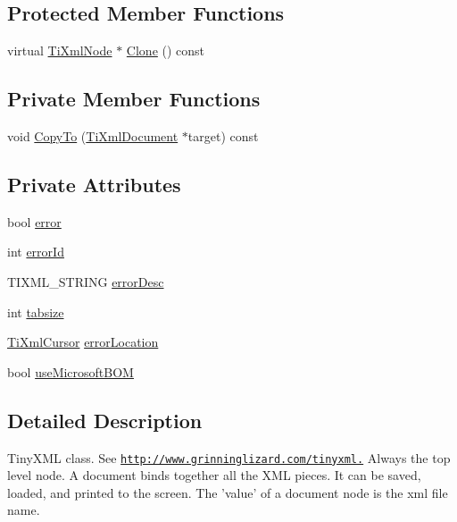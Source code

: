 \subsection*{Protected Member Functions}
\begin{DoxyCompactItemize}
\item 
virtual \hyperlink{class_ti_xml_node}{TiXmlNode} $\ast$ \hyperlink{class_ti_xml_document_ac9e8f09b23454d953b32d1b65cd1409e}{Clone} () const 
\end{DoxyCompactItemize}
\subsection*{Private Member Functions}
\begin{DoxyCompactItemize}
\item 
void \hyperlink{class_ti_xml_document_af69deeb984e060bd00f668460dec8ef2}{CopyTo} (\hyperlink{class_ti_xml_document}{TiXmlDocument} $\ast$target) const 
\end{DoxyCompactItemize}
\subsection*{Private Attributes}
\begin{DoxyCompactItemize}
\item 
bool \hyperlink{class_ti_xml_document_a1ff6a063602f31acae6f37fc049d8bbd}{error}
\item 
int \hyperlink{class_ti_xml_document_acdef97a4bb80729ac6863dd54cee7eeb}{errorId}
\item 
TIXML\_\-STRING \hyperlink{class_ti_xml_document_a2da9a95ba3f9c895a8d7f4de7122a642}{errorDesc}
\item 
int \hyperlink{class_ti_xml_document_af2fa6a010b903d893d52cc6fee5575a1}{tabsize}
\item 
\hyperlink{struct_ti_xml_cursor}{TiXmlCursor} \hyperlink{class_ti_xml_document_aa4030f989f1549f6b897147fc2851d1a}{errorLocation}
\item 
bool \hyperlink{class_ti_xml_document_a4d5400dec9bfb55c640428de33297886}{useMicrosoftBOM}
\end{DoxyCompactItemize}


\subsection{Detailed Description}
TinyXML class. See \href{http://www.grinninglizard.com/tinyxml.}{\tt http://www.grinninglizard.com/tinyxml.} Always the top level node. A document binds together all the XML pieces. It can be saved, loaded, and printed to the screen. The 'value' of a document node is the xml file name.

